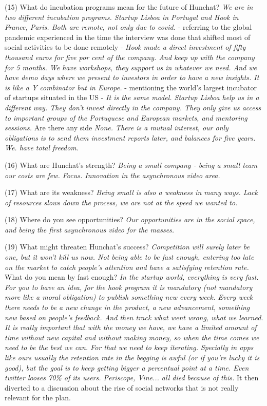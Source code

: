 \documentclass[11pt]{article}
\begin{document}
(15) What do incubation programs mean for the future of Hunchat? \textit{We are in two different incubation programs. Startup Lisboa in Portugal and Hook in France, Paris. Both are remote, not only due to covid.} - referring to the global pandemic experienced in the time the interview was done that shifted most of social activities to be done remotely - \textit{Hook made a direct investment of fifty thousand euros for five por cent of the company. And keep up with the company for 5 months. We have workshops, they support us in whatever we need. And we have demo days where we present to investors in order to have a new insights. It is like a Y combinator but in Europe.} - mentioning the world's largest incubator of startups situated in the US -\textit{ It is the same model. Startup Lisboa help us in a different way. They don't invest directly in the company. They only give us access to important groups of the Portuguese and European markets, and mentoring sessions.} Are there any side \textit{None. There is a mutual interest, our only obligations is to send them investment reports later, and balances for five years. We. have total freedom.}

(16) What are Hunchat’s strength? \textit{Being a small company - being a small team our costs are few. Focus. Innovation in the asynchronous video area.}

(17) What are its weakness? \textit{Being small is also a weakness in many ways. Lack of resources slows down the process, we are not at the speed we wanted to.}

(18) Where do you see opportunities? \textit{Our opportunities are in the social space, and being the first asynchronous video for the masses.}

(19) What might threaten Hunchat’s success? \textit{Competition will surely later be one, but it won't kill us now. Not being able to be fast enough, entering too late on the market to catch people's attention and have a satisfying retention rate.} What do you mean by fast enough? \textit{In the startup world, everything is very fast. For you to have an idea, for the hook program it is mandatory (not mandatory more like a moral obligation) to publish something new every week. Every week there needs to be a new change in the product, a new advancement, something new based on people's feedback. And then track what went wrong, what we learned. It is really important that with the money we have, we have a limited amount of time without new capital and without making money, so when the time comes we need to be the best we can. For that we need to keep iterating. Specially in apps like ours usually the retention rate in the begging is awful (or if you're lucky it is good), but the goal is to keep getting bigger a percentual point at a time. Even twitter looses 70\% of its users. Periscope, Vine... all died because of this.} It then diverted to a discussion about the rise of social networks that is not really relevant for the plan.
\end{document}
